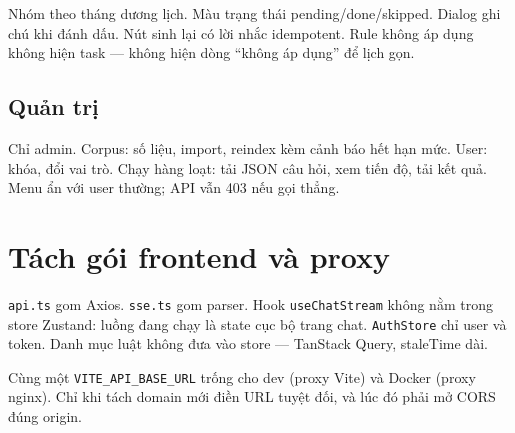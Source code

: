 Nhóm theo tháng dương lịch. Màu trạng thái pending/done/skipped. Dialog ghi chú
khi đánh dấu. Nút sinh lại có lời nhắc idempotent. Rule không áp dụng không hiện
task --- không hiện dòng ``không áp dụng'' để lịch gọn.

\subsection{Quản trị}

Chỉ admin. Corpus: số liệu, import, reindex kèm cảnh báo hết hạn mức. User:
khóa, đổi vai trò. Chạy hàng loạt: tải JSON câu hỏi, xem tiến độ, tải kết quả.
Menu ẩn với user thường; API vẫn 403 nếu gọi thẳng.

\section{Tách gói frontend và proxy}

\texttt{api.ts} gom Axios. \texttt{sse.ts} gom parser. Hook
\texttt{useChatStream} không nằm trong store Zustand: luồng đang chạy là state
cục bộ trang chat. \texttt{AuthStore} chỉ user và token. Danh mục luật không
đưa vào store --- TanStack Query, staleTime dài.

Cùng một \texttt{VITE\_API\_BASE\_URL} trống cho dev (proxy Vite) và Docker
(proxy nginx). Chỉ khi tách domain mới điền URL tuyệt đối, và lúc đó phải mở
CORS đúng origin.

